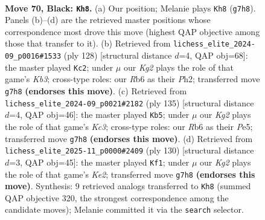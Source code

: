 \documentclass[11pt]{article}
\begin{document}
\clearpage

\begin{figure}[p]\centering
\begin{subfigure}{0.46\textwidth}\centering
\resizebox{\linewidth}{!}{%
\newchessgame
\chessboard[
  setfen={8/4R1k1/1r6/8/5K2/8/7P/3r4 b - - 8 70},
  showmover=false,
  pgfstyle=straightmove, color=movearrow, markmove={g7-h8}
]}
\caption{}
\end{subfigure}\hfill
\begin{subfigure}{0.46\textwidth}\centering
\resizebox{\linewidth}{!}{%
\newchessgame
\chessboard[
  setfen={8/2k5/8/1r6/6R1/1K6/7P/8 w - - 1 65},
  showmover=false,
  pgfstyle=straightmove, color=movearrow, markmove={b3-c2}
]}
\caption{}
\end{subfigure}
\\[4pt]
\begin{subfigure}{0.46\textwidth}\centering
\resizebox{\linewidth}{!}{%
\newchessgame
\chessboard[
  setfen={8/8/2k5/4p3/6r1/2R5/8/3K4 b - - 0 68},
  showmover=false,
  pgfstyle=straightmove, color=movearrow, markmove={c6-b5}
]}
\caption{}
\end{subfigure}\hfill
\begin{subfigure}{0.46\textwidth}\centering
\resizebox{\linewidth}{!}{%
\newchessgame
\chessboard[
  setfen={6R1/8/5p2/8/5k2/8/1r2K3/8 w - - 6 66},
  showmover=false,
  pgfstyle=straightmove, color=movearrow, markmove={e2-f1}
]}
\caption{}
\end{subfigure}
\caption{\textbf{Move 70, Black: \texttt{Kh8}.} (a) Our position; Melanie plays \texttt{Kh8} (\texttt{g7h8}). Panels (b)--(d) are the retrieved master positions whose correspondence most drove this move (highest QAP objective among those that transfer to it). (b) Retrieved from \texttt{lichess\_elite\_2024-09\_p0016\#1533} (ply 128) [structural distance $d$=4, QAP obj=68]: the master played \texttt{Kc2}; under $\mu$ our \emph{Kg2} plays the role of that game's \emph{Kb3}; cross-type roles: our \emph{R}b6 as their \emph{P}h2; transferred move \texttt{g7h8} \textbf{(endorses this move)}. (c) Retrieved from \texttt{lichess\_elite\_2024-09\_p0021\#2182} (ply 135) [structural distance $d$=4, QAP obj=46]: the master played \texttt{Kb5}; under $\mu$ our \emph{Kg2} plays the role of that game's \emph{Kc3}; cross-type roles: our \emph{R}b6 as their \emph{P}e5; transferred move \texttt{g7h8} \textbf{(endorses this move)}. (d) Retrieved from \texttt{lichess\_elite\_2025-11\_p0000\#2409} (ply 130) [structural distance $d$=3, QAP obj=45]: the master played \texttt{Kf1}; under $\mu$ our \emph{Kg2} plays the role of that game's \emph{Ke2}; transferred move \texttt{g7h8} \textbf{(endorses this move)}. Synthesis: 9 retrieved analogs transferred to \texttt{Kh8} (summed QAP objective 320, the strongest correspondence among the candidate moves); Melanie committed it via the \texttt{search} selector.}
\label{fig:thought-m139}
\end{figure}
\end{document}
